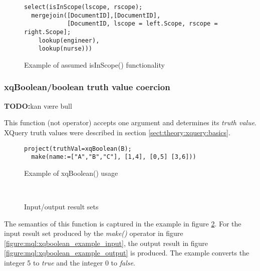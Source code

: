 \begin{figure}[!h]
\centering
\begin{Verbatim}
select(isInScope(lscope, rscope);
  mergejoin([DocumentID],[DocumentID], 
            [DocumentID, lscope = left.Scope, rscope = right.Scope];
    lookup(engineer),
    lookup(nurse)))
\end{Verbatim}
\caption{Example of assumed isInScope() functionality}
\label{figure:mql:isinscope_example}
\end{figure}

\subsubsection{xqBoolean/boolean truth value coercion}
\textbf{\LARGE TODO:}kan v\ae re bull

This function (not operator) accepts one argument and determines its
\textit{truth value}. XQuery truth values were described in
section \ref{sect:theory:xquery:basics}.

\begin{figure}[!h]
\centering
\begin{Verbatim}
project(truthVal=xqBoolean(B); 
  make(name:=["A","B","C"], [1,4], [0,5] [3,6]))
\end{Verbatim}
\caption{Example of xqBoolean() usage}
\label{figure:mql:xqboolean_example}
\end{figure}

\begin{figure}[!h]
\centering
\mbox{
\quad
{}
}
\caption{Input/output result sets}
\end{figure}

The semantics of this function is captured in the example in figure
\ref{figure:mql:xqboolean_example}. For the input result set produced by the
\textit{make()} operator in figure \ref{figure:mql:xqboolean_example_input},
the output result in figure \ref{figure:mql:xqboolean_example_output} is
produced. The example converts the integer 5 to \textit{true} and the integer 0
to \textit{false}. 

